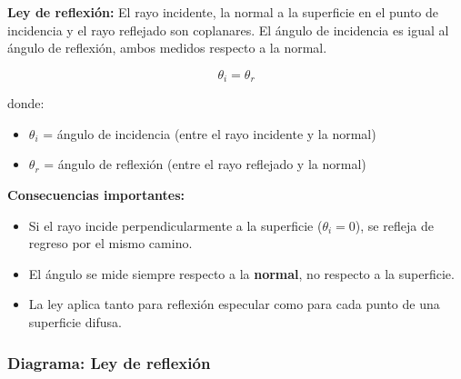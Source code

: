\begin{seccion}
\begin{definicion}
\textbf{Ley de reflexión:} El rayo incidente, la normal a la superficie en el punto de incidencia y el rayo reflejado son coplanares. El ángulo de incidencia es igual al ángulo de reflexión, ambos medidos respecto a la normal.
\end{definicion}

\begin{ecuacion}
$$\theta_i = \theta_r$$

donde:
\begin{itemize}
    \item $\theta_i$ = ángulo de incidencia (entre el rayo incidente y la normal)
    \item $\theta_r$ = ángulo de reflexión (entre el rayo reflejado y la normal)
\end{itemize}
\end{ecuacion}

\textbf{Consecuencias importantes:}
\begin{itemize}
    \item Si el rayo incide perpendicularmente a la superficie ($\theta_i = 0$), se refleja de regreso por el mismo camino.
    \item El ángulo se mide siempre respecto a la \textbf{normal}, no respecto a la superficie.
    \item La ley aplica tanto para reflexión especular como para cada punto de una superficie difusa.
\end{itemize}
\end{seccion}

\subsubsection{Diagrama: Ley de reflexión}

